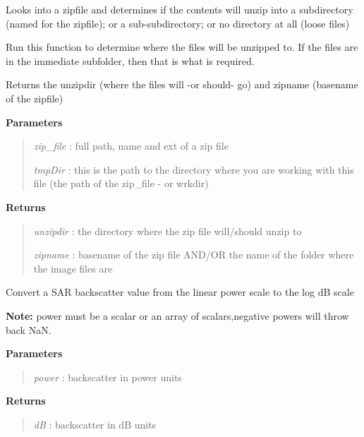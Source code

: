 \documentclass[letterpaper,10pt,english]{sphinxmanual}
\begin{document}

\begin{fulllineitems}
\label{code:Util.getZipRoot}
Looks into a zipfile and determines if the contents will unzip into a subdirectory
(named for the zipfile); or a sub-subdirectory; or no directory at all (loose files)

Run this function to determine where the files will be unzipped to. If the files are in
the immediate subfolder, then that is what is required.

Returns the unzipdir (where the files will -or should- go) and zipname (basename of the zipfile)

\textbf{Parameters}
\begin{quote}

\emph{zip\_file} : full path, name and ext of a zip file

\emph{tmpDir}   : this is the path to the directory where you are working with this file (the path of the zip\_file - or wrkdir)
\end{quote}

\textbf{Returns}
\begin{quote}

\emph{unzipdir} : the directory where the zip file will/should unzip to

\emph{zipname}  : basename of the zip file AND/OR the name of the folder where the image files are
\end{quote}

\end{fulllineitems}


\begin{fulllineitems}
\label{code:Util.getdBScale}
Convert a SAR backscatter value from the linear power scale to the log dB scale

\textbf{Note:} power must be a scalar or an array of scalars,negative powers will throw back NaN.

\textbf{Parameters}
\begin{quote}

\emph{power} : backscatter in power units
\end{quote}

\textbf{Returns}
\begin{quote}

\emph{dB}    : backscatter in dB units
\end{quote}

\end{fulllineitems}
\end{document}
